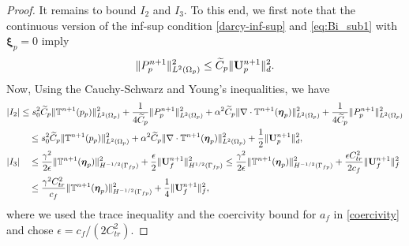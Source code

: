 \documentclass[11pt]{article}
\def\bbeta{\boldsymbol{\eta}}
\def\bxi{\boldsymbol{\xi}}
\def\U{{\bf U}}
\begin{document}
\begin{proof}
It remains to bound $I_2$ and $I_3$. To this end, we first note that the continuous version of the inf-sup condition \eqref{darcy-inf-sup} and \eqref{eq:Bi_sub1} with $\bxi_p = 0$ imply
%  
\begin{equation}\label{Pp-bound}
\|P_p^{n+1}\|_{L^2(\Omega_p)}^2 \le \widetilde C_p \|\U_p^{n+1}\|_d^2.
\end{equation}
% 
Now, Using the Cauchy-Schwarz and Young's inequalities, we have
%
\begin{alignat}{1}
  |I_2| & \leq
  s_0^2\widetilde C_p \|\mathbb{T}^{n+1}(p_p)\|_{L^2(\Omega_p)}^2
  + \frac{1}{4\widetilde C_p}\|P_p^{n+1}\|_{L^2(\Omega_p)}^2
  + \alpha^2\widetilde C_p\|\nabla\cdot \mathbb{T}^{n+1}(\bbeta_p)\|_{L^2(\Omega_p)}^2
  + \frac{1}{4\widetilde C_p}\|P_p^{n+1}\|_{L^2(\Omega_p)}^2
 \nonumber \\
 & \quad
 \le s_0^2\widetilde C_p \|\mathbb{T}^{n+1}(p_p)\|_{L^2(\Omega_p)}^2
 + \alpha^2\widetilde C_p\|\nabla\cdot \mathbb{T}^{n+1}(\bbeta_p)\|_{L^2(\Omega_p)}^2
 + \frac12\|\U_p^{n+1}\|_d^2,\label{H3Bound}\\
|I_3| & \quad \leq \frac{\gamma^2}{2\epsilon}\|\mathbb{T}^{n+1}(\bbeta_p)\|_{H^{-1/2}(\Gamma_{fp})}^2
  + \frac{\epsilon}{2}\|\U_f^{n+1}\|_{H^{1/2}(\Gamma_{fp})}^2
\leq \frac{\gamma^2}{2\epsilon}\|\mathbb{T}^{n+1}(\bbeta_p)\|_{H^{-1/2}(\Gamma_{fp})}^2
+ \frac{\epsilon C_{tr}^2}{2c_f}\|\U_f^{n+1}\|_f^2 \nonumber\\
& \quad \leq  \frac{\gamma^2C_{tr}^2}{c_f}\|\mathbb{T}^{n+1}(\bbeta_p)\|_{H^{-1/2}(\Gamma_{fp})}^2 + \frac14\|\U_f^{n+1}\|_f^2,
\label{H4Bound}
\end{alignat}
%
where we used the trace inequality and the coercivity bound for $a_f$ in \eqref{coercivity} and chose $\epsilon = {c_f}/{(2C_{tr}^2)}$.


\end{proof}
\end{document}

